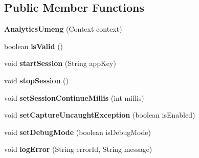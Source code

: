 \subsection*{Public Member Functions}
\begin{DoxyCompactItemize}
\item 
\mbox{\label{classorg_1_1cocos2dx_1_1plugin_1_1AnalyticsUmeng_ac33a544a05f9df6bc49d719672190bdb}} 
{\bfseries Analytics\+Umeng} (Context context)
\item 
\mbox{\label{classorg_1_1cocos2dx_1_1plugin_1_1AnalyticsUmeng_a4bf18ef15e0c821152b3f171b0c115f7}} 
boolean {\bfseries is\+Valid} ()
\item 
\mbox{\label{classorg_1_1cocos2dx_1_1plugin_1_1AnalyticsUmeng_a0734eac4075d33d683c68ed10aab7e38}} 
void {\bfseries start\+Session} (String app\+Key)
\item 
\mbox{\label{classorg_1_1cocos2dx_1_1plugin_1_1AnalyticsUmeng_ab8d5a8bf97050d83ea58eb32dda6350a}} 
void {\bfseries stop\+Session} ()
\item 
\mbox{\label{classorg_1_1cocos2dx_1_1plugin_1_1AnalyticsUmeng_a3577c6c5cdf8368aa425ea930f4d54c7}} 
void {\bfseries set\+Session\+Continue\+Millis} (int millis)
\item 
\mbox{\label{classorg_1_1cocos2dx_1_1plugin_1_1AnalyticsUmeng_a58e9eb2058556e80cea36d372871f4bb}} 
void {\bfseries set\+Capture\+Uncaught\+Exception} (boolean is\+Enabled)
\item 
\mbox{\label{classorg_1_1cocos2dx_1_1plugin_1_1AnalyticsUmeng_a57f2e631181212be091496f7cdd003ec}} 
void {\bfseries set\+Debug\+Mode} (boolean is\+Debug\+Mode)
\item 
\mbox{\label{classorg_1_1cocos2dx_1_1plugin_1_1AnalyticsUmeng_a1935826fdce93b300033b73fcfacc88f}} 
void {\bfseries log\+Error} (String error\+Id, String message)

\end{DoxyCompactItemize}
